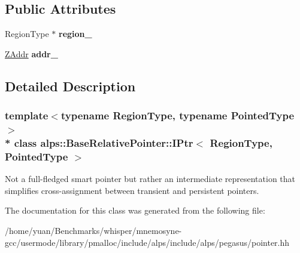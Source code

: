 \subsection*{Public Attributes}
\begin{DoxyCompactItemize}
\item 
Region\+Type $\ast$ {\bfseries region\+\_\+}\hypertarget{classalps_1_1BaseRelativePointer_1_1IPtr_afa52ffae9a98b4ca95f89295db3634a6}{}\label{classalps_1_1BaseRelativePointer_1_1IPtr_afa52ffae9a98b4ca95f89295db3634a6}

\item 
\hyperlink{structalps_1_1ZAddr}{Z\+Addr} {\bfseries addr\+\_\+}\hypertarget{classalps_1_1BaseRelativePointer_1_1IPtr_a49c9c3ea7e1f7f289ed6b2c1ffd2912b}{}\label{classalps_1_1BaseRelativePointer_1_1IPtr_a49c9c3ea7e1f7f289ed6b2c1ffd2912b}

\end{DoxyCompactItemize}


\subsection{Detailed Description}
\subsubsection*{template$<$typename Region\+Type, typename Pointed\+Type$>$\\*
class alps\+::\+Base\+Relative\+Pointer\+::\+I\+Ptr$<$ Region\+Type, Pointed\+Type $>$}

Not a full-\/fledged smart pointer but rather an intermediate representation that simplifies cross-\/assignment between transient and persistent pointers. 

The documentation for this class was generated from the following file\+:\begin{DoxyCompactItemize}
\item 
/home/yuan/\+Benchmarks/whisper/mnemosyne-\/gcc/usermode/library/pmalloc/include/alps/include/alps/pegasus/pointer.\+hh\end{DoxyCompactItemize}
